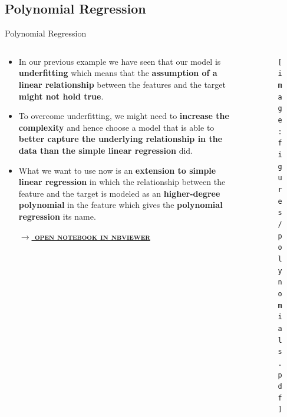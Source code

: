 \documentclass[document.tex]{subfiles}
\begin{document}
    \subsection{Polynomial Regression}
    
    \begin{frame}{Polynomial Regression}
        \begin{columns}
            \begin{column}{0.6\textwidth}
                \begin{itemize}
                    \item In our previous example we have seen that our model is \textbf{underfitting} which means that the \textbf{assumption of a linear relationship} between the features and the target \textbf{might not hold true}. 
                    \item To overcome underfitting, we might need to \textbf{increase the complexity} and hence choose a model that is able to \textbf{better capture the underlying relationship in the data than the simple linear regression} did.
                    \item What we want to use now is an \textbf{extension to simple linear regression} in which the relationship between the feature and the target is modeled as an \textbf{higher-degree polynomial} in the feature which gives the \textbf{polynomial regression} its name.
                    \vspace{1mm}
                    
                    \small{\href{https://nbviewer.jupyter.org/github/saschaschworm/big-data-and-data-science/blob/master/notebooks/demos/rental-prices-polynomial-regression.ipynb}{\textsc{\textbf{$\rightarrow$ open notebook in nbviewer}}}}
                \end{itemize}
            \end{column}
            \begin{column}{0.4\textwidth}
                \begin{figure}
                    \label{fig:polynomials}
                    \texttt{[image: figures/polynomials.pdf]}
                \end{figure}
            \end{column}
        \end{columns}
    \end{frame}
\end{document}
